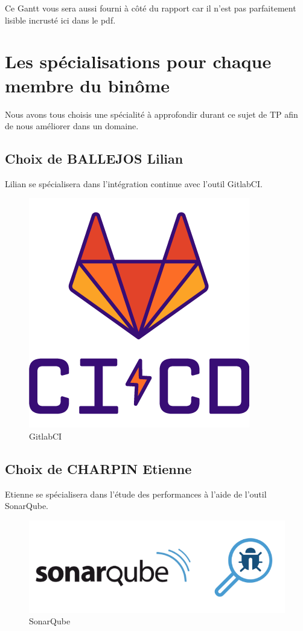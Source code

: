 \documentclass[12pt,french]{article} %
\begin{document}
Ce Gantt vous sera aussi fourni à côté du rapport car il n'est pas parfaitement lisible incrusté ici dans le pdf.

\section{Les spécialisations pour chaque membre du binôme}

Nous avons tous choisis une spécialité à approfondir durant ce sujet de TP afin de nous améliorer dans un domaine.

\subsection{Choix de BALLEJOS Lilian}

Lilian se spécialisera dans l'intégration continue avec l'outil GitlabCI.

\begin{figure}[H]
	\centering
	\includegraphics[scale=0.35]{clilian.png}
	\caption{GitlabCI}    
\end{figure}



\subsection{Choix de CHARPIN Etienne}

Etienne se spécialisera dans l'étude des performances à l'aide de l'outil SonarQube.

\begin{figure}[H]
	\centering
	\includegraphics[scale=0.35]{cetienne.png}
	\caption{SonarQube}    
\end{figure}
\end{document}
